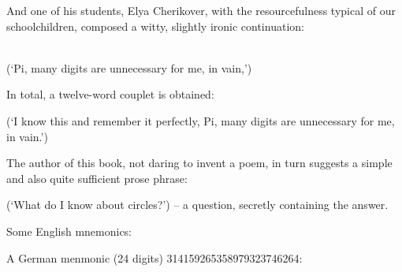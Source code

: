 
And one of his students, Elya Cherikover, with the resourcefulness typical of our schoolchildren, composed a witty, slightly ironic continuation:

\begin{small}
\\
(`Pi, many digits are unnecessary for me, in vain,') 
\end{small}

In total, a twelve-word couplet is obtained:

\begin{small}
\end{small}

(`I know this and remember it perfectly, Pi, many digits are unnecessary for me, in vain.')

The author of this book, not daring to invent a poem, in turn suggests a simple and also quite sufficient prose phrase:

\begin{small}
\end{small}

(`What do I know about circles?') -- a question, secretly containing the answer.

Some English mnemonics:

\begin{small}



\end{small}

A German menmonic (24 digits) \num{3 1 4 1 5 9 2 6 5 3 5 8 9 7 9 3 2 3 7 4 6 2 6 4}:

\begin{small}
\end{small}

